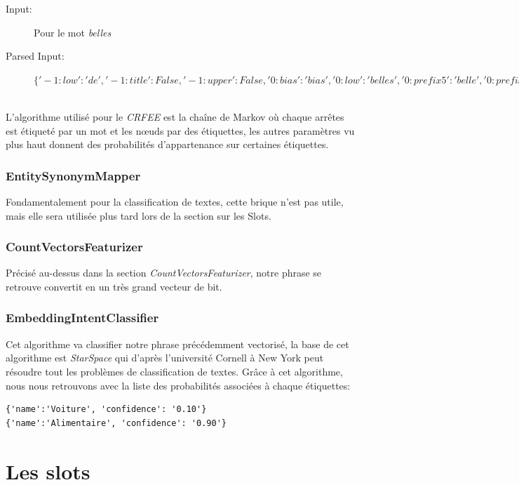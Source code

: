 \begin{description}
\item[Input:] Pour le mot \textit{belles}
\item[Parsed Input:] $\{'-1:low': 'de', '-1:title': False, '-1:upper': False, 
'0:bias': 'bias', '0:low': 'belles', '0:prefix5': 'belle', '0:prefix2': 
'be', '0:suffix5': 'elles', '0:suffix3': 'les', '0:suffix2': 'es', 
'0:upper': False, '0:title': False, '0:digit': False, '1:low': 'pommes',
'1:title': False, '1:upper': False\}$
\end{description}
\ \\
L'algorithme utilisé pour le \textit{CRFEE} est la chaîne de Markov où chaque arrêtes est étiqueté par un mot et les nœuds par des étiquettes, les autres paramètres vu plus haut donnent des probabilités d'appartenance sur certaines étiquettes.

\subsubsection{EntitySynonymMapper}
Fondamentalement pour la classification de textes, cette brique n'est pas utile, mais elle sera utilisée plus tard lors de la section sur les Slots.

\subsubsection{CountVectorsFeaturizer}
Précisé au-dessus dans la section \textit{CountVectorsFeaturizer}, notre phrase se retrouve convertit en un très grand vecteur de bit.

\subsubsection{EmbeddingIntentClassifier}
Cet algorithme va classifier notre phrase précédemment vectorisé, la base de cet algorithme est \textit{StarSpace} qui d'après l'université Cornell à New York peut résoudre tout les problèmes de classification de textes.\linebreak
Grâce à cet algorithme, nous nous retrouvons avec la liste des probabilités associées à chaque étiquettes:

\begin{lstlisting}
{'name':'Voiture', 'confidence': '0.10'}
{'name':'Alimentaire', 'confidence': '0.90'}
\end{lstlisting}

\pagebreak
\section{Les slots}

